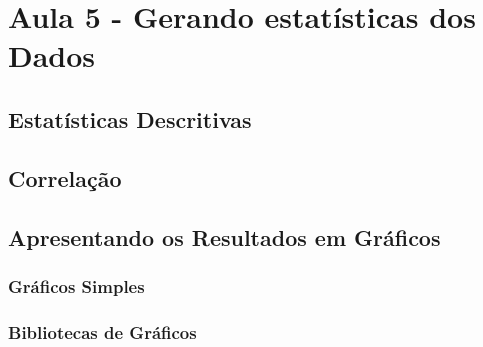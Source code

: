 
\chapter{Aula 5 - Gerando estatísticas dos Dados}

\section{Estatísticas Descritivas}

\section{Correlação}

\section{Apresentando os Resultados em Gráficos}

\subsection{Gráficos Simples}

\subsection{Bibliotecas de Gráficos}

